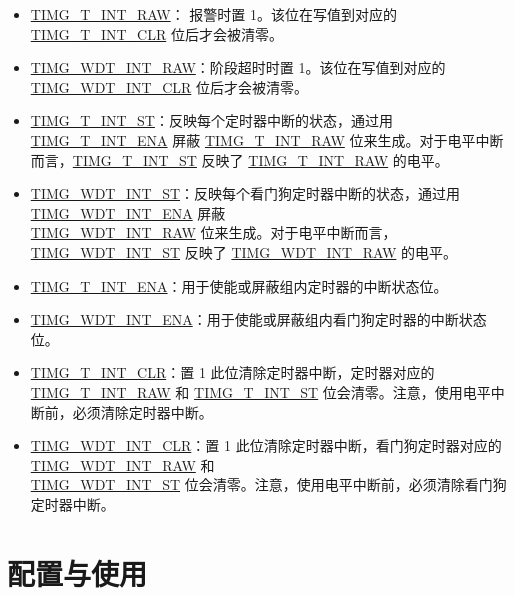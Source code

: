 \documentclass[main\_\_CN.tex]{subfiles}
\begin{document}
\begin{itemize}

\item \hyperref[fielddesc:TIMGTXINTRAW]{TIMG\_T\_INT\_RAW}：
报警时置 1。该位在写值到对应的 \hyperref[fielddesc:TIMGTXINTCLR]{TIMG\_T\_INT\_CLR} 位后才会被清零。
\item \hyperref[fielddesc:TIMGWDTINTRAW]{TIMG\_WDT\_INT\_RAW}：阶段超时时置 1。该位在写值到对应的 \hyperref[fielddesc:TIMGWDTINTCLR]{TIMG\_WDT\_INT\_CLR} 位后才会被清零。
\item \hyperref[fielddesc:TIMGTXINTST]{TIMG\_T\_INT\_ST}：反映每个定时器中断的状态，通过用 \hyperref[fielddesc:TIMGTXINTENA]{TIMG\_T\_INT\_ENA} 屏蔽 \hyperref[fielddesc:TIMGTXINTRAW]{TIMG\_T\_INT\_RAW} 位来生成。对于电平中断而言，\hyperref[fielddesc:TIMGTXINTST]{TIMG\_T\_INT\_ST} 反映了 \hyperref[fielddesc:TIMGTXINTRAW]{TIMG\_T\_INT\_RAW} 的电平。
\item \hyperref[fielddesc:TIMGWDTINTST]{TIMG\_WDT\_INT\_ST}：反映每个看门狗定时器中断的状态，通过用 \hyperref[fielddesc:TIMGWDTINTENA]{TIMG\_WDT\_INT\_ENA} 屏蔽 \\\hyperref[fielddesc:TIMGWDTINTRAW]{TIMG\_WDT\_INT\_RAW} 位来生成。对于电平中断而言，\hyperref[fielddesc:TIMGWDTINTST]{TIMG\_WDT\_INT\_ST} 反映了 \hyperref[fielddesc:TIMGWDTINTRAW]{TIMG\_WDT\_INT\_RAW} 的电平。
\item \hyperref[fielddesc:TIMGTXINTENA]{TIMG\_T\_INT\_ENA}：用于使能或屏蔽组内定时器的中断状态位。
\item \hyperref[fielddesc:TIMGWDTINTENA]{TIMG\_WDT\_INT\_ENA}：用于使能或屏蔽组内看门狗定时器的中断状态位。
\item \hyperref[fielddesc:TIMGTXINTCLR]{TIMG\_T\_INT\_CLR}：置 1 此位清除定时器中断，定时器对应的 \hyperref[fielddesc:TIMGTXINTRAW]{TIMG\_T\_INT\_RAW} 和 \hyperref[fielddesc:TIMGTXINTST]{TIMG\_T\_INT\_ST} 位会清零。注意，使用电平中断前，必须清除定时器中断。
\item \hyperref[fielddesc:TIMGWDTINTCLR]{TIMG\_WDT\_INT\_CLR}：置 1 此位清除定时器中断，看门狗定时器对应的 \hyperref[fielddesc:TIMGWDTINTRAW]{TIMG\_WDT\_INT\_RAW} 和\\\hyperref[fielddesc:TIMGWDTINTST]{TIMG\_WDT\_INT\_ST} 位会清零。注意，使用电平中断前，必须清除看门狗定时器中断。
\end{itemize}
\section{配置与使用}
\end{document}

